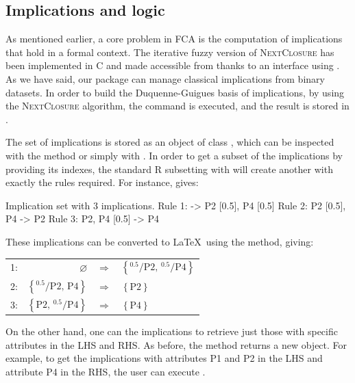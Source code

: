 \hypertarget{implications-and-logic-1}{%
\subsection{Implications and logic}\label{implications-and-logic-1}}

As mentioned earlier, a core problem in FCA is the computation of
implications that hold in a formal context. The iterative fuzzy version
of \textsc{NextClosure} has been implemented in C and made accessible
from  thanks to an interface using . As we have
said, our package can manage classical implications from binary
datasets. In order to build the Duquenne-Guigues basis of implications,
by using the \textsc{NextClosure} algorithm, the command
 is executed, and the result is stored in
.

The set of implications is stored as an object of class
, which can be inspected with the 
method or simply with . In order to get a subset
of the implications by providing its indexes, the standard R subsetting
with \samp{[} will create another  with exactly
the rules required. For instance,  gives:

\begin{example}
Implication set with 3 implications.
Rule 1: {} -> {P2 [0.5], P4 [0.5]}
Rule 2: {P2 [0.5], P4} -> {P2}
Rule 3: {P2, P4 [0.5]} -> {P4}
\end{example}

These implications can be converted to \LaTeX~using the
 method, giving:

\begingroup\footnotesize

\begin{longtable*}{rrcl}
1: &\ensuremath{\varnothing}&\ensuremath{\Rightarrow}&\ensuremath{\left\{{^{0.5}}\!/\mathrm{P2},\, {^{0.5}}\!/\mathrm{P4}\right\}}\\
2: &\ensuremath{\left\{{^{0.5}}\!/\mathrm{P2},\, \mathrm{P4}\right\}}&\ensuremath{\Rightarrow}&\ensuremath{\left\{\mathrm{P2}\right\}}\\
3: &\ensuremath{\left\{\mathrm{P2},\, {^{0.5}}\!/\mathrm{P4}\right\}}&\ensuremath{\Rightarrow}&\ensuremath{\left\{\mathrm{P4}\right\}}\\
\end{longtable*}\endgroup

On the other hand, one can  the implications to retrieve
just those with specific attributes in the LHS and RHS. As before, the
method returns a new  object. For example, to get the implications with attributes P1 and P2 in the
LHS and attribute P4 in the RHS, the user can execute
.

